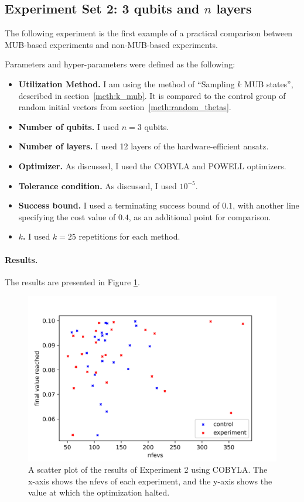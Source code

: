 \documentclass[a4paper,12pt]{article}
\newcommand{\e}[1]{ 10^{#1}}
\newenvironment{denseitemize}%
  {\begin{itemize}%
    \setlength{\itemsep}{0pt}}%
  {\end{itemize}}
\begin{document}
\subsection{Experiment Set 2: 3 qubits and $n$ layers} \label{subsec:3qubits}
The following experiment is the first example of a practical comparison between MUB-based experiments and non-MUB-based experiments.

Parameters and hyper-parameters were defined as the following:
\begin{denseitemize}
    \item \textbf{Utilization Method.} I am using the method of ``Sampling $k$ MUB states'', described in section~\ref{meth:k_mub}. It is compared to the control group of random initial vectors from section~\ref{meth:random_thetas}.
    \item \textbf{Number of qubits.} I used $n=3$ qubits.
    \item \textbf{Number of layers.} I used 12 layers of the hardware-efficient ansatz.
    \item \textbf{Optimizer.} As discussed, I used the COBYLA and POWELL optimizers.
    \item \textbf{Tolerance condition.} As discussed, I used $\e{-5}$.
    \item \textbf{Success bound.} I used a terminating success bound of $0.1$, with another line specifying the cost value of $0.4$, as an additional point for comparison.
    \item \textbf{$k$.} I used $k=25$ repetitions for each method.
\end{denseitemize}

\paragraph*{Results.}
The results are presented in Figure \ref{fig:3qubits_cobyla}.
\begin{figure}[]
    \centering
    \captionsetup{justification=centering, margin=0.5cm}
    \includegraphics[scale=0.8]{3qubits_cobyla.png}
    \caption{A scatter plot of the results of Experiment 2 using COBYLA. The x-axis shows the nfevs of each experiment, and the y-axis shows the value at which the optimization halted.}
    \label{fig:3qubits_cobyla}
\end{figure}
\end{document}
